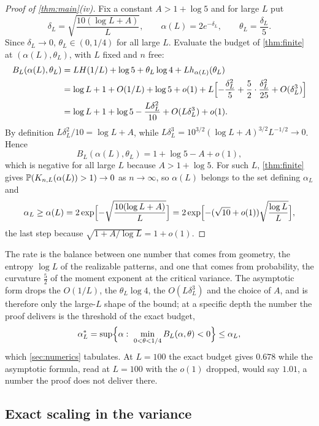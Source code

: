 \begin{proof}[Proof of \cref{thm:main}(iv)]
Fix a constant $A>1+\log5$ and for large $L$ put
\[
\delta_L=\sqrt{\frac{10(\log L+A)}L},\qquad\alpha(L)=2e^{-\delta_L},\qquad\theta_L=\frac{\delta_L}5 .
\]
Since $\delta_L\to0$, $\theta_L\in(0,1/4)$ for all large $L$. Evaluate the budget of \cref{thm:finite} at $(\alpha(L),\theta_L)$, with $L$ fixed and $n$ free:
\begin{align*}
B_L(\alpha(L),\theta_L)&=LH(1/L)+\log5+\theta_L\log4+Lh_{\alpha(L)}(\theta_L)\\
&=\log L+1+O(1/L)+\log5+o(1)+L\Bigl[-\frac{\delta_L^2}5+\frac52\cdot\frac{\delta_L^2}{25}+O(\delta_L^3)\Bigr]\\
&=\log L+1+\log5-\frac{L\delta_L^2}{10}+O(L\delta_L^3)+o(1).
\end{align*}
By definition $L\delta_L^2/10=\log L+A$, while $L\delta_L^3=10^{3/2}(\log L+A)^{3/2}L^{-1/2}\to0$. Hence
\[
B_L(\alpha(L),\theta_L)=1+\log5-A+o(1),
\]
which is negative for all large $L$ because $A>1+\log5$. For such $L$, \cref{thm:finite} gives $\mathbb{P}(K_{n,L}(\alpha(L))>1)\to0$ as $n\to\infty$, so $\alpha(L)$ belongs to the set defining $\alpha_L$ and
\[
\alpha_L\ge\alpha(L)=2\exp\Bigl[-\sqrt{\frac{10(\log L+A)}L}\Bigr]=2\exp\Bigl[-(\sqrt{10}+o(1))\sqrt{\frac{\log L}L}\Bigr],
\]
the last step because $\sqrt{1+A/\log L}=1+o(1)$.
\end{proof}

The rate is the balance between one number that comes from geometry, the entropy $\log L$ of the realizable patterns, and one that comes from probability, the curvature $\tfrac52$ of the moment exponent at the critical variance. The asymptotic form drops the $O(1/L)$, the $\theta_L\log4$, the $O(L\delta^3_L)$ and the choice of $A$, and is therefore only the large-$L$ shape of the bound; at a specific depth the number the proof delivers is the threshold of the exact budget,
\begin{equation}\label{eq:alpha-star}
\alpha^*_L=\sup\Bigl\{\alpha:\ \min_{0<\theta<1/4}B_L(\alpha,\theta)<0\Bigr\}\le\alpha_L,
\end{equation}
which \cref{sec:numerics} tabulates. At $L=100$ the exact budget gives $0.678$ while the asymptotic formula, read at $L=100$ with the $o(1)$ dropped, would say $1.01$, a number the proof does not deliver there.

\subsection{Exact scaling in the variance}

